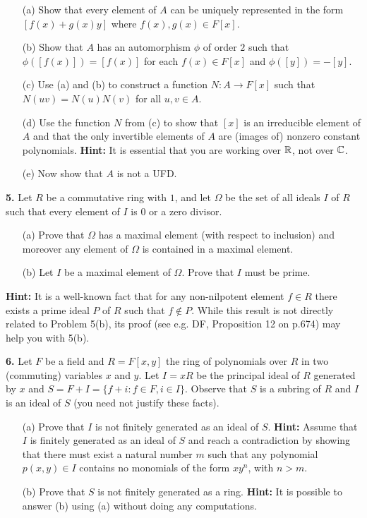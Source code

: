 \documentclass[12pt]{article}
\begin{document}
\begin{itemize}
\item[(a)] Show that every element of $A$ can be uniquely represented in the form $[f(x)+g(x)y]$
where $f(x),g(x)\in F[x]$. 
\item[(b)] Show that $A$ has an automorphism $\phi$ of order $2$ such that
$\phi([f(x)])=[f(x)]$ for each $f(x)\in F[x]$ and $\phi([y])= -[y]$.
\item[(c)] Use (a) and (b) to construct a function $N:A\to F[x]$ such that $N(uv)=N(u)N(v)$ for all $u,v\in A.$   
\item[(d)] Use the function $N$ from (c) to show that $[x]$ is an irreducible element of $A$
and that the only invertible elements of $A$ are (images of) nonzero constant polynomials.
{\bf Hint:} It is essential that you are working over ${\mathbb R}$, not over ${\mathbb C}$.
\item[(e)] Now show that $A$ is not a UFD.
\end{itemize}
\skv
{\bf 5.}  Let $R$ be a commutative ring with $1$, and let $\Omega$ be the set
of all ideals $I$ of $R$ such that every element of $I$ is $0$ or a zero divisor.
\begin{itemize}
\item[(a)] Prove that $\Omega$ has a maximal element (with respect to inclusion)
and moreover any element of $\Omega$ is contained in a maximal element.
\item[(b)] Let $I$ be a maximal element of $\Omega$. Prove that $I$ must be prime.
\end{itemize}
{\bf Hint:} It is a well-known fact that for any non-nilpotent element
$f\in R$ there exists a prime ideal $P$ of $R$ such that $f\not\in P$.
While this result is not directly related to Problem 5(b), its proof
(see e.g. DF, Proposition 12 on p.674) may help you with 5(b).

\skv
{\bf 6.} Let $F$ be a field and $R=F[x,y]$ the ring of polynomials over $R$ in two (commuting) variables $x$ and $y$. Let $I=xR$ be the principal ideal of $R$ generated by $x$ and $S=F+I=\{f+i: f\in F, i\in I\}$. Observe that $S$ is a subring of $R$ and $I$ is an ideal of $S$ (you need not justify these facts).
\begin{itemize}
\item[(a)] Prove that $I$ is not finitely generated as an ideal of $S$.
{\bf Hint:} Assume that $I$ is finitely generated as an ideal of $S$
and reach a contradiction by showing that there must exist a natural number $m$ 
such that any polynomial $p(x,y)\in I$ contains no monomials of the form $xy^n$, with $n>m.$
\item[(b)] Prove that $S$ is not finitely generated as a ring.
{\bf Hint:} It is possible to answer (b) using (a) without doing any computations.
\end{itemize}
\end{document}

